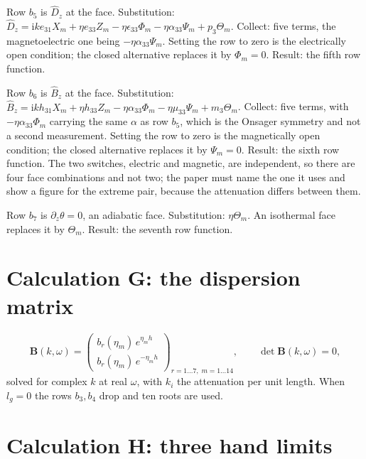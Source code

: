 \documentclass[11pt]{article}
\makeatletter
\newif\ifshowworked
\newenvironment{worked}{%
  \ifshowworked\par\smallskip\noindent\textit{Working.}\par\smallskip\else
  \setbox\z@\vbox\bgroup\fi}{\ifshowworked\par\smallskip\else\egroup\fi}
\newcommand{\ii}{\mathrm{i}}
\makeatother
\begin{document}
\begin{worked}
Row $b_5$ is $\hat D_z$ at the face. Substitution:
$\hat D_z=\ii ke_{31}X_m+\eta e_{33}Z_m-\eta\epsilon_{33}\Phi_m-\eta\alpha_{33}\Psi_m+p_3\Theta_m$.
Collect: five terms, the magnetoelectric one being $-\eta\alpha_{33}\Psi_m$. Setting the row to zero is
the electrically open condition; the closed alternative replaces it by $\Phi_m=0$. Result: the fifth row
function.
\end{worked}

\begin{worked}
Row $b_6$ is $\hat B_z$ at the face. Substitution:
$\hat B_z=\ii kh_{31}X_m+\eta h_{33}Z_m-\eta\alpha_{33}\Phi_m-\eta\mu_{33}\Psi_m+m_3\Theta_m$. Collect:
five terms, with $-\eta\alpha_{33}\Phi_m$ carrying the same $\alpha$ as row $b_5$, which is the Onsager
symmetry and not a second measurement. Setting the row to zero is the magnetically open condition; the
closed alternative replaces it by $\Psi_m=0$. Result: the sixth row function. The two switches, electric
and magnetic, are independent, so there are four face combinations and not two; the paper must name the
one it uses and show a figure for the extreme pair, because the attenuation differs between them.
\end{worked}

\begin{worked}
Row $b_7$ is $\partial_z\theta=0$, an adiabatic face. Substitution: $\eta\Theta_m$. An isothermal face
replaces it by $\Theta_m$. Result: the seventh row function.
\end{worked}

\section{Calculation G: the dispersion matrix}\label{sec:calcG}

\begin{equation}
\mathbf B(k,\omega)=
\begin{pmatrix}
b_r(\eta_m)\,e^{\eta_mh}\\
b_r(\eta_m)\,e^{-\eta_mh}
\end{pmatrix}_{r=1\dots7,\;m=1\dots14},
\qquad \det\mathbf B(k,\omega)=0 ,
\end{equation}
solved for complex $k$ at real $\omega$, with $k_i$ the attenuation per unit length. When $l_g=0$ the rows
$b_3,b_4$ drop and ten roots are used.

\section{Calculation H: three hand limits}\label{sec:calcH}
\end{document}
